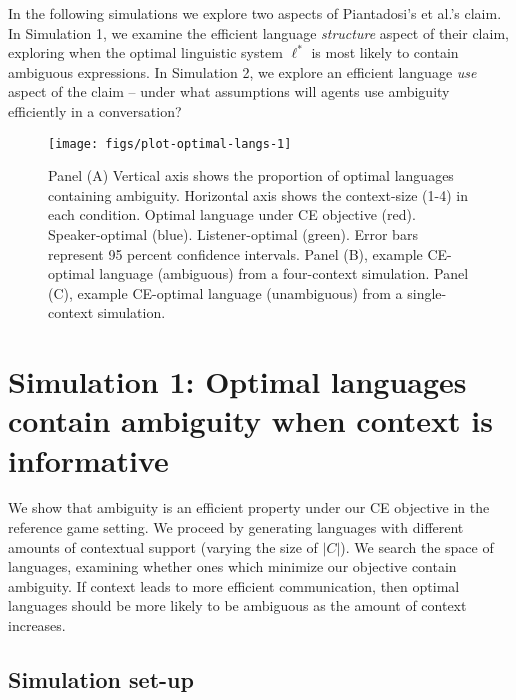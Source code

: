 \documentclass[10pt, letterpaper]{article}
\newenvironment{CodeChunk}{}{}
\begin{document}
In the following simulations we explore two aspects of Piantadosi's et
al.'s claim. In Simulation 1, we examine the efficient language
\emph{structure} aspect of their claim, exploring when the optimal
linguistic system \(\ell^*\) is most likely to contain ambiguous
expressions. In Simulation 2, we explore an efficient language
\emph{use} aspect of the claim -- under what assumptions will agents use
ambiguity efficiently in a conversation?\par

\begin{CodeChunk}
\begin{figure*}[h]

{\centering \texttt{[image: figs/plot-optimal-langs-1]} 

}

\caption[Panel (A) Vertical axis shows the proportion of optimal languages containing ambiguity]{Panel (A) Vertical axis shows the proportion of optimal languages containing ambiguity. Horizontal axis shows the context-size (1-4) in each condition. Optimal language under CE objective (red). Speaker-optimal (blue). Listener-optimal (green). Error bars represent 95 percent confidence intervals. Panel (B), example CE-optimal language (ambiguous) from a four-context simulation. Panel (C), example CE-optimal language (unambiguous) from a single-context simulation.}\label{fig:plot-optimal-langs}
\end{figure*}
\end{CodeChunk}

\section{Simulation 1: Optimal languages contain ambiguity when context
is
informative}\label{simulation-1-optimal-languages-contain-ambiguity-when-context-is-informative}

We show that ambiguity is an efficient property under our CE objective
in the reference game setting. We proceed by generating languages with
different amounts of contextual support (varying the size of \(|C|\)).
We search the space of languages, examining whether ones which minimize
our objective contain ambiguity. If context leads to more efficient
communication, then optimal languages should be more likely to be
ambiguous as the amount of context increases.\par

\subsection{Simulation set-up}\label{simulation-set-up}
\end{document}
